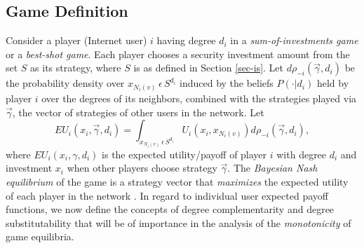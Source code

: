 \documentclass[letterpaper,12pt,onecolumn, nodraft]{IEEEtran}
\begin{document}
\subsection{Game Definition}
Consider a player (Internet user) $i$ having degree $d_{i}$ in a \emph{sum-of-investments game} or a \emph{best-shot game}. Each player chooses a security investment amount from the set $S$ as its strategy, where $S$ is as defined in Section \ref{sec-is}. Let $d\rho_{-i}(\overrightarrow \gamma, d_{i})$ be the probability density over $x_{N_{i}(v)}\,\epsilon\,S^{d_{i}}$ induced by the beliefs $P(\cdot|d_{i})$ held by player $i$ over the degrees of its neighbors, combined with the strategies played via $\overrightarrow \gamma$, the vector of strategies of other users in the network. Let 
\begin{equation}
EU_{i}(x_{i}, \overrightarrow \gamma, d_{i}) = \int_{x_{N_{i}(v)}\,\epsilon\,S^{d_{i}}} U_{i}(x_{i}, x_{N_{i}(v)})d\rho_{-i}(\overrightarrow \gamma, d_{i}),
\end{equation}
where $EU_{i}(x_{i}, \gamma, d_{i})$ is the expected utility/payoff of player $i$ with degree $d_{i}$ and investment $x_{i}$ when other players choose strategy $\overrightarrow \gamma$. The \emph{Bayesian Nash equilibrium} of the game is a strategy vector that \emph{maximizes} the expected utility of each player in the network \cite{ft}\cite{or}.  In regard to individual user expected payoff functions, we now define the concepts of degree complementarity and degree substitutability that will be of importance in the analysis of the \emph{monotonicity} of game equilibria. 
\end{document}
